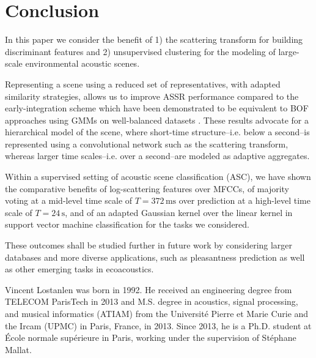 \documentclass[journal]{IEEEtran}
\makeatletter
\newcommand*{\ie}{i.e.\@\xspace}
\newcommand{\ja}[1]{\textcolor{magenta}{Joakim : #1}}
\makeatother
\begin{document}
\section{Conclusion}

In this paper we consider the benefit of 1) the scattering transform for building discriminant features and 2) unsupervised clustering for the modeling of large-scale environmental acoustic scenes.

Representing a scene using a reduced set of representatives, with adapted similarity strategies, allows us to improve ASSR performance compared to the early-integration scheme which have been demonstrated to be equivalent to BOF approaches using GMMs on well-balanced datasets \cite{lagrange:hal-01082501}. These results advocate for a hierarchical model of the scene, where short-time structure--\ie below a second--is represented using a convolutional network such as the scattering transform, whereas larger time scales--\ie over a second--are modeled as adaptive aggregates.

Within a supervised setting of acoustic scene classification (ASC), we have shown the comparative benefits of log-scattering features over MFCCs, of majority voting at a mid-level time scale of $T=372\,\mathrm{ms}$ over prediction at a high-level time scale of $T=24\,\mathrm{s}$, and of an adapted Gaussian kernel over the linear kernel in support vector machine classification for the tasks we considered.

These outcomes shall be studied further in future work by considering larger databases and more diverse applications, such as pleasantness prediction \cite{lafaySoundscapePilot} as well as other emerging tasks in ecoacoustics.

%
%
\printbibliography

\begin{IEEEbiography}{Vincent Lostanlen} was born in 1992. He received an engineering degree from TELECOM ParisTech in 2013 and M.S. degree in acoustics, signal processing, and musical informatics (ATIAM) from the Universit\'{e} Pierre et Marie Curie and the Ircam (UPMC) in Paris, France, in 2013. Since 2013, he is a Ph.D. student at \'{E}cole normale sup\'{e}rieure in Paris, working under the supervision of St\'{e}phane Mallat.
\end{IEEEbiography}
\end{document}

